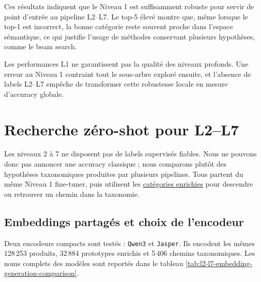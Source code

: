 \documentclass[12pt,a4paper]{report}
\begin{document}
Ces résultats indiquent que le Niveau 1 est suffisamment robuste pour servir de point d'entrée au pipeline L2--L7. Le top-5 élevé montre que, même lorsque le top-1 est incorrect, la bonne catégorie reste souvent proche dans l'espace sémantique, ce qui justifie l'usage de méthodes conservant plusieurs hypothèses, comme le beam search.

Les performances L1 ne garantissent pas la qualité des niveaux profonds. Une erreur au Niveau 1 contraint tout le sous-arbre exploré ensuite, et l'absence de labels L2--L7 empêche de transformer cette robustesse locale en mesure d'accuracy globale.

\chapter{Recherche zéro-shot pour L2--L7}
\label{chap:l2-l7-zero-shot}

Les niveaux 2 à 7 ne disposent pas de labels supervisés fiables. Nous ne pouvons donc pas annoncer une accuracy classique ; nous comparons plutôt des hypothèses taxonomiques produites par plusieurs pipelines. Tous partent du même Niveau 1 fine-tuner, puis utilisent les \hyperref[chap:category-enrichment]{catégories enrichies} pour descendre ou retrouver un chemin dans la taxonomie.

\section{Embeddings partagés et choix de l'encodeur}
\label{sec:l2-l7-embedder-comparison}

Deux encodeurs compacts sont testés : \texttt{Qwen3} et \texttt{Jasper}. Ils encodent les mêmes 128\,253 produits, 32\,884 prototypes enrichis et 5\,406 chemins taxonomiques. Les noms complets des modèles sont reportés dans le tableau \ref{tab:l2-l7-embedding-generation-comparison}.

\begin{table}[H]
    \centering
    \caption{Coût de génération des embeddings partagés L2--L7}
    \label{tab:l2-l7-embedding-generation-comparison}
\end{table}
\end{document}
